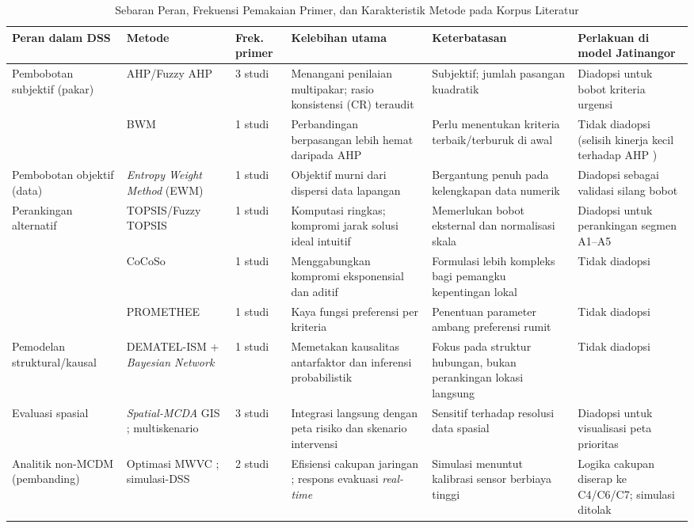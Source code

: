 \documentclass[10pt,twocolumn,a4paper]{article}
\begin{document}
\begin{table}[!t]
\centering
\caption{Sebaran Peran, Frekuensi Pemakaian Primer, dan Karakteristik Metode pada Korpus Literatur}\label{tab:methods}
\scriptsize
\begin{tabular}{@{}P{2.2cm}P{3.0cm}P{1.0cm}P{3.4cm}P{3.3cm}P{3.5cm}@{}}
\toprule
Peran dalam DSS & Metode & Frek. primer & Kelebihan utama & Keterbatasan & Perlakuan di model Jatinangor \\
\midrule
Pembobotan subjektif (pakar) & AHP/Fuzzy AHP \cite{ahmed,kanj,shid} & 3 studi & Menangani penilaian multipakar; rasio konsistensi (CR) teraudit & Subjektif; jumlah pasangan kuadratik & Diadopsi untuk bobot kriteria urgensi \\
 & BWM \cite{baddour} & 1 studi & Perbandingan berpasangan lebih hemat daripada AHP & Perlu menentukan kriteria terbaik/terburuk di awal & Tidak diadopsi (selisih kinerja kecil terhadap AHP \cite{baddour}) \\
Pembobotan objektif (data) & \textit{Entropy Weight Method} (EWM) \cite{yuhang} & 1 studi & Objektif murni dari dispersi data lapangan & Bergantung penuh pada kelengkapan data numerik & Diadopsi sebagai validasi silang bobot \\
Perankingan alternatif & TOPSIS/Fuzzy TOPSIS \cite{kanj} & 1 studi & Komputasi ringkas; kompromi jarak solusi ideal intuitif & Memerlukan bobot eksternal dan normalisasi skala & Diadopsi untuk perankingan segmen A1--A5 \\
 & CoCoSo \cite{baddour} & 1 studi & Menggabungkan kompromi eksponensial dan aditif & Formulasi lebih kompleks bagi pemangku kepentingan lokal & Tidak diadopsi \\
 & PROMETHEE \cite{alma} & 1 studi & Kaya fungsi preferensi per kriteria & Penentuan parameter ambang preferensi rumit & Tidak diadopsi \\
Pemodelan struktural/kausal & DEMATEL-ISM + \textit{Bayesian Network} \cite{zheng} & 1 studi & Memetakan kausalitas antarfaktor dan inferensi probabilistik & Fokus pada struktur hubungan, bukan perankingan lokasi langsung & Tidak diadopsi \\
Evaluasi spasial & \textit{Spatial-MCDA} GIS \cite{feiz}; multiskenario \cite{choi,kab} & 3 studi & Integrasi langsung dengan peta risiko dan skenario intervensi & Sensitif terhadap resolusi data spasial & Diadopsi untuk visualisasi peta prioritas \\
Analitik non-MCDM (pembanding) & Optimasi MWVC \cite{wang}; simulasi-DSS \cite{gonz} & 2 studi & Efisiensi cakupan jaringan \cite{wang}; respons evakuasi \textit{real-time} \cite{gonz} & Simulasi \cite{gonz} menuntut kalibrasi sensor berbiaya tinggi & Logika cakupan \cite{wang} diserap ke C4/C6/C7; simulasi \cite{gonz} ditolak \\
\bottomrule
\end{tabular}
\end{table}
\end{document}
